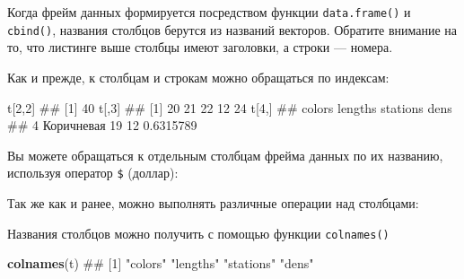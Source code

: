 \documentclass[]{book}
\newenvironment{Shaded}{\begin{snugshade}}{\end{snugshade}}
\newcommand{\KeywordTok}[1]{\textcolor[rgb]{0.13,0.29,0.53}{\textbf{#1}}}
\newcommand{\DecValTok}[1]{\textcolor[rgb]{0.00,0.00,0.81}{#1}}
\newcommand{\StringTok}[1]{\textcolor[rgb]{0.31,0.60,0.02}{#1}}
\newcommand{\OperatorTok}[1]{\textcolor[rgb]{0.81,0.36,0.00}{\textbf{#1}}}
\newcommand{\NormalTok}[1]{#1}
\begin{document}
Когда фрейм данных формируется посредством функции \texttt{data.frame()}
и \texttt{cbind()}, названия столбцов берутся из названий векторов.
Обратите внимание на то, что листинге выше столбцы имеют заголовки, а
строки --- номера.

Как и прежде, к столбцам и строкам можно обращаться по индексам:

\begin{Shaded}
\begin{Highlighting}[]
\NormalTok{t[}\DecValTok{2}\NormalTok{,}\DecValTok{2}\NormalTok{]}
\NormalTok{## [1] 40}
\NormalTok{t[,}\DecValTok{3}\NormalTok{]}
\NormalTok{## [1] 20 21 22 12 24}
\NormalTok{t[}\DecValTok{4}\NormalTok{,]}
\NormalTok{##       colors lengths stations      dens}
\NormalTok{## 4 Коричневая      19       12 0.6315789}
\end{Highlighting}
\end{Shaded}

Вы можете обращаться к отдельным столбцам фрейма данных по их названию,
используя оператор \texttt{\$} (доллар):

\begin{Shaded}
\end{Shaded}

Так же как и ранее, можно выполнять различные операции над столбцами:

\begin{Shaded}
\end{Shaded}

Названия столбцов можно получить с помощью функции \texttt{colnames()}

\begin{Shaded}
\begin{Highlighting}[]
\KeywordTok{colnames}\NormalTok{(t)}
\NormalTok{## [1] "colors"   "lengths"  "stations" "dens"}
\end{Highlighting}
\end{Shaded}
\end{document}
